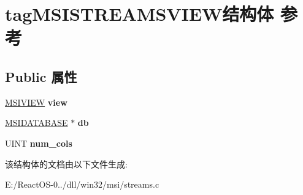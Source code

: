 \hypertarget{structtag_m_s_i_s_t_r_e_a_m_s_v_i_e_w}{}\section{tag\+M\+S\+I\+S\+T\+R\+E\+A\+M\+S\+V\+I\+E\+W结构体 参考}
\label{structtag_m_s_i_s_t_r_e_a_m_s_v_i_e_w}
\subsection*{Public 属性}
\begin{DoxyCompactItemize}
\item 
\mbox{\label{structtag_m_s_i_s_t_r_e_a_m_s_v_i_e_w_a383999f44c5f1125c9e52203402e525e}} 
\hyperlink{structtag_m_s_i_v_i_e_w}{M\+S\+I\+V\+I\+EW} {\bfseries view}
\item 
\mbox{\label{structtag_m_s_i_s_t_r_e_a_m_s_v_i_e_w_a557fb0b930c0b5f7d90c1a447710ac6d}} 
\hyperlink{structtag_m_s_i_d_a_t_a_b_a_s_e}{M\+S\+I\+D\+A\+T\+A\+B\+A\+SE} $\ast$ {\bfseries db}
\item 
\mbox{\label{structtag_m_s_i_s_t_r_e_a_m_s_v_i_e_w_afac616fe5863ea642e0bfaed807e19ce}} 
U\+I\+NT {\bfseries num\+\_\+cols}
\end{DoxyCompactItemize}


该结构体的文档由以下文件生成\+:\begin{DoxyCompactItemize}
\item 
E\+:/\+React\+O\+S-\/0../dll/win32/msi/streams.\+c\end{DoxyCompactItemize}
